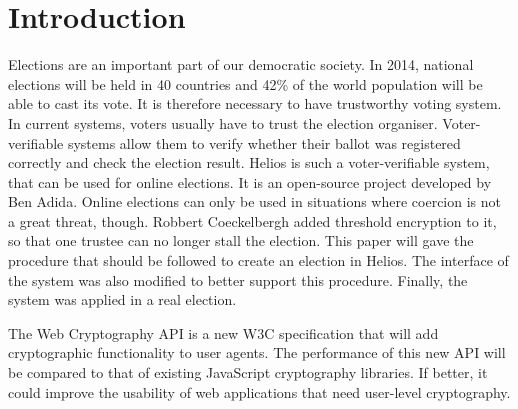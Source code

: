 % 
%

\section{Introduction}

Elections are an important part of our democratic society. In 2014, national elections will be held in 40 countries and 42\% of the world population will be able to cast its vote.\cite{news:economist_2014_ballot_boxes} It is therefore necessary to have trustworthy voting system. In current systems, voters usually have to trust the election organiser. Voter-verifiable systems allow them to verify whether their ballot was registered correctly and check the election result. Helios is such a voter-verifiable system, that can be used for online elections. It is an open-source project developed by Ben Adida.\cite{site:adida_helios_documentation} Online elections can only be used in situations where coercion is not a great threat, though. Robbert Coeckelbergh added threshold encryption to it, so that one trustee can no longer stall the election.\cite{coeckelbergh_application_and_extension_of_the_helios_voting_system} This paper will gave the procedure that should be followed to create an election in Helios. The interface of the system was also modified to better support this procedure. Finally, the system was applied in a real election.

\par The Web Cryptography API is a new W3C specification that will add cryptographic functionality to user agents.\cite{sleevi_watson_web_cryptography_api} The performance of this new API will be compared to that of existing JavaScript cryptography libraries. If better, it could improve the usability of web applications that need user-level cryptography.
